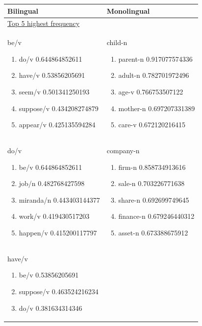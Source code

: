 \documentclass[12pt]{article}
\begin{document}
	\begin{longtable}{ p{7cm} | p{7cm} }
		\textbf{Bilingual} & \textbf{Monolingual}\\
		\hline
		\underline{Top 5 highest frequency} &  \\
		be/v
		\begin{enumerate}
			\item do/v 0.644864852611
			\item have/v 0.53856205691
			\item seem/v 0.501341250193
			\item suppose/v 0.434208274879
			\item appear/v 0.425135594284
		\end{enumerate} & 
		child-n
		\begin{enumerate}
			\item parent-n 0.917077574336
			\item adult-n 0.782701972496
			\item age-v 0.766753507122
			\item mother-n 0.697207331389
			\item care-v 0.672120216415
		\end{enumerate}
		\\
		do/v
		\begin{enumerate}
			\item be/v 0.644864852611
			\item job/n 0.482768427598
			\item miranda/n 0.443403144377
			\item work/v 0.419430517203
			\item happen/v 0.415200117797
		\end{enumerate} &
		company-n
		\begin{enumerate}
			\item firm-n 0.858734913616
			\item sale-n 0.703226771638
			\item share-n 0.692699749645
			\item finance-n 0.679246440312
			\item asset-n 0.673388675912
		\end{enumerate}
		\\
		have/v
		\begin{enumerate}
			\item be/v 0.53856205691
			\item suppose/v 0.463524216234
			\item do/v 0.381634314346

\end{enumerate}
\end{longtable}
\end{document}
